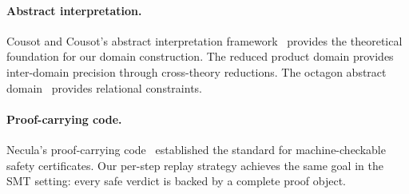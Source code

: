 \documentclass[11pt]{article}
\begin{document}
\paragraph{Abstract interpretation.}
Cousot and Cousot's abstract interpretation
framework~\cite{cousot77} provides the theoretical foundation
for our domain construction.  The reduced product domain
provides inter-domain precision through cross-theory reductions.
The octagon abstract
domain~\cite{mine06} provides relational constraints.

\paragraph{Proof-carrying code.}
Necula's proof-carrying code~\cite{necula97} established the
standard for machine-checkable safety certificates.
Our per-step replay strategy achieves the same goal in the
SMT setting: every safe verdict is backed by a complete
proof object.
\end{document}
